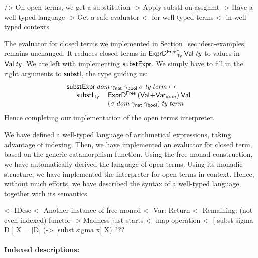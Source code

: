 \begin{wstructure}
    /> On open terms, we get a substitution
        -> Apply substI on assgnmt
            -> Have a well-typed language
            -> Get a safe evaluator 
                <- for well-typed terms 
                <- in well-typed contexts
\end{wstructure}

The evaluator for closed terms we implemented in
Section~\ref{sec:idesc-examples} remains unchanged. It reduces closed
terms in $\FreeIMonad{\HExprFreeD}{\Ty}{\Val{\!}}\: \V{ty}$ to values in
$\Val{\V{ty}}$. We are left with implementing $\substH$. We simply
have to fill in the right arguments to $\substI$, the type guiding us:
%
\[\stk{
\substH\: \V{dom}\:
          \gammaNat\: \gammaBool\:
          \V{\sigma}\: 
          \V{ty}\: 
          \V{term} \mapsto  \\
\;\;\ \begin{array}{ll}
       \substI_{\Ty}\: &  \HExprFreeD\: 
                         (\SUM{\Val{\!}}{\Var{\V{dom}}{}})\: 
                         \Val{\!} \\
                      &
                        (\V{\sigma}\: \V{dom}\: \gammaNat\: \gammaBool)\:
                        \V{ty}\:
                        \V{term}
      \end{array}
}\]
%
Hence completing our implementation of the open terms interpreter. 

We have defined a well-typed language of arithmetical expressions,
taking advantage of indexing. Then, we have implemented an evaluator
for closed term, based on the generic catamorphism function. Using the
free monad construction, we have automatically derived the language of
open terms. Using its monadic structure, we have implemented the
interpreter for open terms in context. Hence, without much efforts, we
have described the syntax of a well-typed language, together with its
semantics.

\begin{wstructure}
<- IDesc
    <- Another instance of free monad
        <- Var: Return
        <- Remaining: (not even indexed) functor
    -> Madness just starts
        <- map operation
        <- [ subst sigma D ] X = [D] (\x -> [subst sigma x] X)
        ???
\end{wstructure}

\paragraph{Indexed descriptions:}

